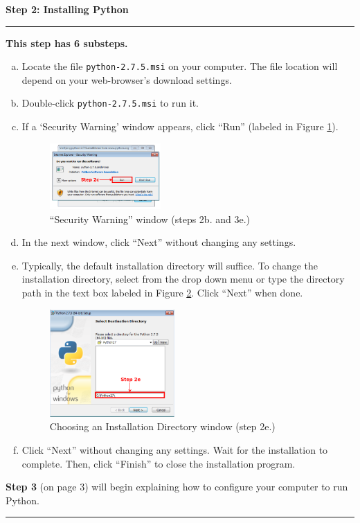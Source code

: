 \documentclass[11pt,english]{article}
\newcommand{\myhrule}{\vspace{0.3cm}\hrule\vspace{0.3cm}}
\begin{document}
\newpage
{\Large {\bf Step 2: Installing Python}}
\myhrule
{\bf This step has 6 substeps.}
\begin{enumerate}[a.]
\item Locate the file \texttt{python-2.7.5.msi} on your computer. The file
location will depend on your web-browser's download settings.
\item Double-click \texttt{python-2.7.5.msi} to run it.
\item If a `Security Warning' window appears, click ``Run'' (labeled in Figure
\ref{fig:dia2}).
\begin{figure}[h]
\begin{center}
\includegraphics[width=0.4\textwidth]{dia2}
\end{center}
\vspace{-0.5cm}
\caption{``Security Warning'' window (steps 2b. and 3e.)}
\label{fig:dia2}
\end{figure}
\item In the next window, click ``Next'' without changing any settings.
\item Typically, the default installation directory will suffice. To change the
installation directory, select from the drop down menu or type the directory
path in the text box labeled in Figure \ref{fig:dia3}. Click ``Next'' when
done.
\begin{figure}[h]
\begin{center}
\includegraphics[width=0.45\textwidth]{dia3}
\end{center}
\vspace{-0.5cm}
\caption{Choosing an Installation Directory window (step 2e.)}
\label{fig:dia3}
\end{figure}
\item Click ``Next'' without changing any settings. Wait for the installation
to complete. Then, click ``Finish'' to close the installation program.
\end{enumerate}
\vfill
{\bf Step 3} (on page 3) will begin explaining how to configure your computer
to run Python.
\myhrule
\end{document}
